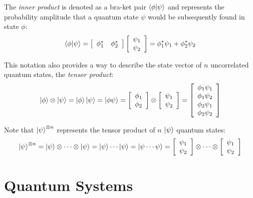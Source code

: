 The \textit{inner product} is denoted as a bra-ket pair $\left\langle{\phi}|{\psi}\right\rangle$ and represents the probability amplitude that a quantum state $\psi$ would be subsequently found in state $\phi$:
$$\left\langle{\phi}|{\psi}\right\rangle=\left[\begin{array}{cc}\phi_{1}^{*} & \phi_{2}^{*} \end{array}\right]\left[\begin{array}{c}\psi_{1} \\ \psi_{2} \end{array}\right]=\phi_{1}^{*}\psi_{1}+\phi_{2}^{*}\psi_{2}$$

This notation also provides a way to describe the state vector of $n$ uncorrelated quantum states, the \textit{tensor product}:
$$\left|{\phi}\right\rangle\otimes\left|{\psi}\right\rangle=\left|{\phi}\right\rangle\left|{\psi}\right\rangle=\left|{\phi\psi}\right\rangle=\left[\begin{array}{c}\phi_{1} \\ \phi_{2}\end{array}\right]\otimes\left[\begin{array}{c}\psi_{1} \\ \psi_{2}\end{array}\right]=\left[\begin{array}{c}\phi_{1}\psi_{1} \\ \phi_{1}\psi_{2} \\ \phi_{2}\psi_{1} \\ \phi_{2}\psi_{2}\end{array}\right]$$

Note that $\left|{\psi}\right\rangle^{\otimes n}$ represents the tensor product of $n$ $\left|{\psi}\right\rangle$ quantum states:
$$\left|{\psi}\right\rangle^{\otimes n}=\left|{\psi}\right\rangle\otimes\cdots\otimes\left|{\psi}\right\rangle=\left|{\psi}\right\rangle\cdots\left|{\psi}\right\rangle=\left|{\psi\cdots\psi}\right\rangle=\left[\begin{array}{c}\psi_{1} \\ \psi_{2} \end{array}\right]\otimes\cdots\otimes\left[\begin{array}{c}\psi_{1} \\ \psi_{2} \end{array}\right]$$

\section{Quantum Systems}


